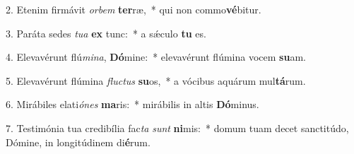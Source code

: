 2. Etenim firmávit \textit{or}\textit{bem} \textbf{ter}ræ,~*  qui non commo\textbf{vé}bitur.\

3. Paráta sedes \textit{tu}\textit{a} \textbf{ex} tunc:~*  a sǽculo \textbf{tu} es.\

4. Elevavérunt flú\textit{mi}\textit{na}, \textbf{Dó}mine:~*  elevavérunt flúmina vocem \textbf{su}am.\

5. Elevavérunt flúmina \textit{fluc}\textit{tus} \textbf{su}os,~*  a vócibus aquárum mul\textbf{tá}rum.\

6. Mirábiles elati\textit{ó}\textit{nes} \textbf{ma}ris:~*  mirábilis in altis \textbf{Dó}minus.\

7. Testimónia tua credibília fac\textit{ta} \textit{sunt} \textbf{ni}mis:~*  domum tuam decet sanctitúdo, Dómine, in longitúdinem di\textbf{é}rum.\

